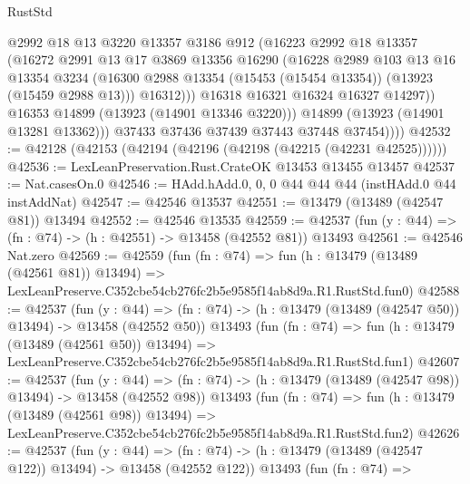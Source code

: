 \begin{lexlean}{RustStd}
\begin{coremodule}
                    @2992
                    @18
                    @13
                    @3220
                    @13357
                    @3186
                    @912
                    (@16223
                      @2992
                      @18
                      @13357
                      (@16272
                        @2991
                        @13
                        @17
                        @3869
                        @13356
                        @16290
                        (@16228
                          @2989
                          @103
                          @13
                          @16
                          @13354
                          @3234
                          (@16300 @2988 @13354 (@15453 (@15454 @13354)) (@13923 (@15459 @2988 @13)))
                          @16312)))
                    @16318
                    @16321
                    @16324
                    @16327
                    @14297))
                @16353
                @14899
                (@13923 (@14901 @13346 @3220)))
              @14899
              (@13923 (@14901 @13281 @13362)))
            @37433
            @37436
            @37439
            @37443
            @37448
            @37454))))
@42532 := @42128 (@42153 (@42194 (@42196 (@42198 (@42215 (@42231 @42525))))))
@42536 := LexLeanPreservation.Rust.CrateOK @13453 @13455 @13457
@42537 := Nat.casesOn.{0}
@42546 := HAdd.hAdd.{0, 0, 0} @44 @44 @44 (instHAdd.{0} @44 instAddNat)
@42547 := @42546 @13537
@42551 := @13479 (@13489 (@42547 @81)) @13494
@42552 := @42546 @13535
@42559 := @42537 (fun (y : @44) => (fn : @74) -> (h : @42551) -> @13458 (@42552 @81)) @13493
@42561 := @42546 Nat.zero
@42569 := @42559
    (fun (fn : @74) =>
    fun (h : @13479 (@13489 (@42561 @81)) @13494) =>
    LexLeanPreserve.C352cbe54cb276fc2b5e9585f14ab8d9a.R1.RustStd.fun0)
@42588 := @42537
    (fun (y : @44) =>
    (fn : @74) -> (h : @13479 (@13489 (@42547 @50)) @13494) -> @13458 (@42552 @50))
    @13493
    (fun (fn : @74) =>
    fun (h : @13479 (@13489 (@42561 @50)) @13494) =>
    LexLeanPreserve.C352cbe54cb276fc2b5e9585f14ab8d9a.R1.RustStd.fun1)
@42607 := @42537
    (fun (y : @44) =>
    (fn : @74) -> (h : @13479 (@13489 (@42547 @98)) @13494) -> @13458 (@42552 @98))
    @13493
    (fun (fn : @74) =>
    fun (h : @13479 (@13489 (@42561 @98)) @13494) =>
    LexLeanPreserve.C352cbe54cb276fc2b5e9585f14ab8d9a.R1.RustStd.fun2)
@42626 := @42537
    (fun (y : @44) =>
    (fn : @74) -> (h : @13479 (@13489 (@42547 @122)) @13494) -> @13458 (@42552 @122))
    @13493
    (fun (fn : @74) =>

\end{coremodule}
\end{lexlean}
